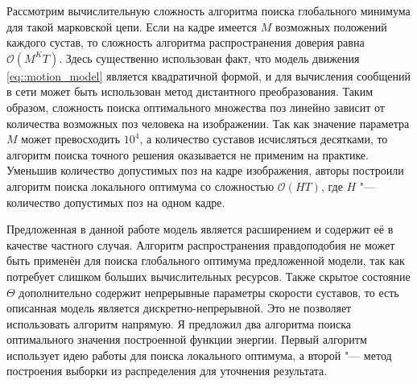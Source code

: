 Рассмотрим вычислительную сложность алгоритма поиска глобального минимума для такой марковской цепи. Если на кадре имеется $M$ возможных положений каждого сустав, то сложность алгоритма распространения доверия равна $\mathcal{O}(M^{K}T)$. Здесь существенно использован факт, что модель движения \eqref{eq::motion_model} является квадратичной формой, и для вычисления сообщений в сети может быть использован метод дистантного преобразования. Таким образом, сложность поиска оптимального множества поз линейно зависит от количества возможных поз человека на изображении. Так как значение параметра $M$ может превосходить $10^4$, а количество суставов исчисляться десятками, то алгоритм поиска точного решения оказывается не применим на практике. Уменьшив количество допустимых поз на кадре изображения, авторы \cite{park2011n} построили алгоритм поиска локального оптимума со сложностью $\mathcal{O}(HT)$, где $H$ "--- количество допустимых поз на одном кадре.

Предложенная в данной работе модель является расширением \cite{park2011n} и содержит её в качестве частного случая. Алгоритм распространения правдоподобия не может быть применён для поиска глобального оптимума предложенной модели, так как потребует слишком больших вычислительных ресурсов. Также скрытое состояние $\Theta$ дополнительно содержит непрерывные параметры скорости суставов, то есть описанная модель является дискретно-непрерывной. Это не позволяет использовать алгоритм \cite{park2011n} напрямую. Я предложил два алгоритма поиска оптимального значения построенной функции энергии. Первый алгоритм использует идею работы \cite{park2011n} для поиска локального оптимума, а второй "--- метод построения выборки из распределения для уточнения результата.

